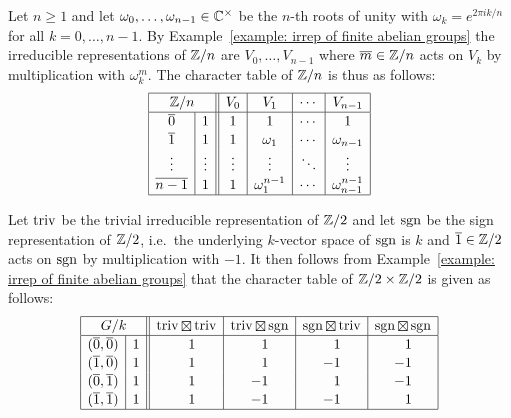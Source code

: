 \begin{example}
  Let $n \geq 1$ and let $\omega_0, \dotsc, \omega_{n-1} \in \mathbb{C}^\times$ be the $n$-th roots of unity with $\omega_k = e^{2 \pi i k / n}$ for all $k = 0, \dotsc, n-1$.
  By Example~\ref{example: irrep of finite abelian groups} the irreducible representations of $\mathbb{Z}/n$ are $V_0, \dotsc, V_{n-1}$ where $\overline{m} \in \mathbb{Z}/n$ acts on $V_k$ by multiplication with $\omega_k^m$.
  The character table of $\mathbb{Z}/n$ is thus as follows:
  \[
    \begin{array}{|c|c||c|c|c|c|}
      \hline
        \multicolumn{2}{|c||}{\Integer/n}
      & V_0
      & V_1
      & \cdots
      & V_{n-1}
      \\
      \hline
        \class{0}
      & 1
      & 1
      & 1
      & \cdots
      & 1
      \\
        \class{1}
      & 1
      & 1
      & \omega_1
      & \cdots
      & \omega_{n-1}
      \\
        \vdots
      & \vdots
      & \vdots
      & \vdots
      & \ddots
      & \vdots
      \\
        \class{n-1}
      & 1
      & 1
      & \omega_1 ^{n-1}
      & \cdots
      & \omega_{n-1}^{n-1}
      \\
      \hline
    \end{array}
  \]
\end{example}


\begin{example}
  Let $\operatorname{triv}$ be the trivial irreducible representation of $\mathbb{Z}/2$ and let $\operatorname{sgn}$ be the sign representation of $\mathbb{Z}/2$, i.e.\ the underlying $k$-vector space of $\operatorname{sgn}$ is $k$ and $\overline{1} \in \mathbb{Z}/2$ acts on $\operatorname{sgn}$ by multiplication with $-1$.
  It then follows from Example~\ref{example: irrep of finite abelian groups} that the character table of $\mathbb{Z}/2 \times \mathbb{Z}/2$ is given as follows:
  \[
    \begingroup
    \renewcommand{\arraystretch}{1.1}
    \begin{array}{|c|c||c|c|c|c|}
      \hline
        \multicolumn{2}{|c||}{G/k}
      & \triv \outertensor \triv
      & \triv \outertensor \sgn
      & \sgn \outertensor \triv
      & \sgn \outertensor \sgn
      \\
      \hline
        (\class{0},\class{0})
      & 1
      & \phantom{-}1
      & \phantom{-}1
      & \phantom{-}1
      & \phantom{-}1
      \\
        (\class{1},\class{0})
      & 1
      & \phantom{-}1
      & \phantom{-}1
      & -1
      & -1
      \\
        (\class{0},\class{1})
      & 1
      & \phantom{-}1
      & -1
      & \phantom{-}1
      & -1
      \\
        (\class{1},\class{1})
      & 1
      & \phantom{-}1
      & -1
      & -1
      & \phantom{-}1
      \\
      \hline
    \end{array}
    \endgroup
  \]
\end{example}


